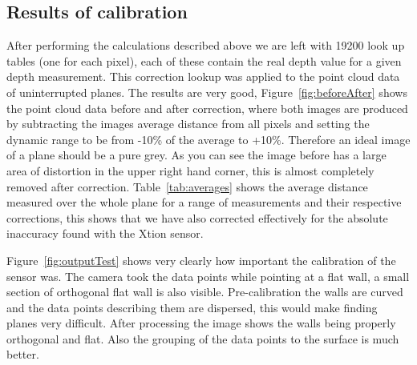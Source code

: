 \documentclass[]{article}
\begin{document}
{\subsection{Results of calibration} %
 \label{sub:results_of_calibration}
 After performing the calculations described above we are left with 19200 look up tables (one for each pixel), each of these contain the real depth value for a given depth measurement. This correction lookup was applied to the point cloud data of uninterrupted planes. The results are very good, Figure~\ref{fig:beforeAfter} shows the point cloud data before and after correction, where both images are produced by subtracting the images average distance from all pixels and setting the dynamic range to be from -10\% of the average to +10\%. Therefore an ideal image of a plane should be a pure grey. As you can see the image before has a large area of distortion in the upper right hand corner, this is almost completely removed after correction. Table~\ref{tab:averages} shows the average distance measured over the whole plane for a range of measurements and their respective corrections, this shows that we have also corrected effectively for the absolute inaccuracy found with the Xtion sensor. 

 Figure~\ref{fig:outputTest} shows very clearly how important the calibration of the sensor was. The camera took the data points while pointing at a flat wall, a small section of orthogonal flat wall is also visible. Pre-calibration the walls are curved and the data points describing them are dispersed, this would make finding planes very difficult. After processing the image shows the walls being properly orthogonal and flat. Also the grouping of the data points to the surface is much better.


}
\end{document}
